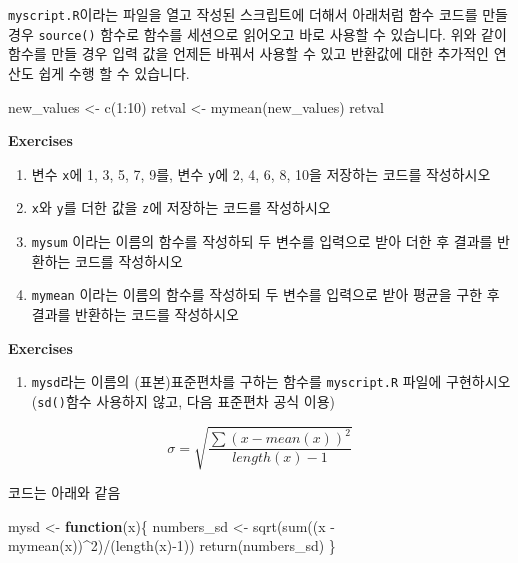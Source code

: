 \documentclass[
]{book}
\newenvironment{Shaded}{\begin{snugshade}}{\end{snugshade}}
\newcommand{\ControlFlowTok}[1]{\textcolor[rgb]{0.13,0.29,0.53}{\textbf{#1}}}
\newcommand{\DecValTok}[1]{\textcolor[rgb]{0.00,0.00,0.81}{#1}}
\newcommand{\FunctionTok}[1]{\textcolor[rgb]{0.00,0.00,0.00}{#1}}
\newcommand{\NormalTok}[1]{#1}
\newcommand{\OtherTok}[1]{\textcolor[rgb]{0.56,0.35,0.01}{#1}}
\newcommand{\SpecialCharTok}[1]{\textcolor[rgb]{0.00,0.00,0.00}{#1}}
\providecommand{\tightlist}{%
  \setlength{\itemsep}{0pt}\setlength{\parskip}{0pt}}
\begin{document}
\texttt{myscript.R}이라는 파일을 열고 작성된 스크립트에 더해서 아래처럼 함수 코드를 만들 경우 \texttt{source()} 함수로 함수를 세션으로 읽어오고 바로 사용할 수 있습니다. 위와 같이 함수를 만들 경우 입력 값을 언제든 바꿔서 사용할 수 있고 반환값에 대한 추가적인 연산도 쉽게 수행 할 수 있습니다.

\begin{Shaded}
\begin{Highlighting}[]
\NormalTok{new\_values }\OtherTok{\textless{}{-}} \FunctionTok{c}\NormalTok{(}\DecValTok{1}\SpecialCharTok{:}\DecValTok{10}\NormalTok{)}
\NormalTok{retval }\OtherTok{\textless{}{-}} \FunctionTok{mymean}\NormalTok{(new\_values)}
\NormalTok{retval}
\end{Highlighting}
\end{Shaded}

\textbf{Exercises}

\begin{enumerate}
\def\labelenumi{\arabic{enumi}.}
\item
  변수 \texttt{x}에 1, 3, 5, 7, 9를, 변수 \texttt{y}에 2, 4, 6, 8, 10을 저장하는 코드를 작성하시오
\item
  \texttt{x}와 \texttt{y}를 더한 값을 \texttt{z}에 저장하는 코드를 작성하시오
\item
  \texttt{mysum} 이라는 이름의 함수를 작성하되 두 변수를 입력으로 받아 더한 후 결과를 반환하는 코드를 작성하시오
\item
  \texttt{mymean} 이라는 이름의 함수를 작성하되 두 변수를 입력으로 받아 평균을 구한 후 결과를 반환하는 코드를 작성하시오
\end{enumerate}

\textbf{Exercises}

\begin{enumerate}
\def\labelenumi{\arabic{enumi})}
\tightlist
\item
  \texttt{mysd}라는 이름의 (표본)표준편차를 구하는 함수를 \texttt{myscript.R} 파일에 구현하시오 (\texttt{sd()}함수 사용하지 않고, 다음 표준편차 공식 이용)
\end{enumerate}

\[ 
\sigma = \sqrt{\frac{\sum(x-mean(x))^2}{length(x)-1}} 
\]

코드는 아래와 같음

\begin{Shaded}
\begin{Highlighting}[]
\NormalTok{mysd }\OtherTok{\textless{}{-}} \ControlFlowTok{function}\NormalTok{(x)\{}
\NormalTok{  numbers\_sd }\OtherTok{\textless{}{-}} \FunctionTok{sqrt}\NormalTok{(}\FunctionTok{sum}\NormalTok{((x }\SpecialCharTok{{-}} \FunctionTok{mymean}\NormalTok{(x))}\SpecialCharTok{\^{}}\DecValTok{2}\NormalTok{)}\SpecialCharTok{/}\NormalTok{(}\FunctionTok{length}\NormalTok{(x)}\SpecialCharTok{{-}}\DecValTok{1}\NormalTok{))  }
  \FunctionTok{return}\NormalTok{(numbers\_sd)}
\NormalTok{\}}
\end{Highlighting}
\end{Shaded}
\end{document}
